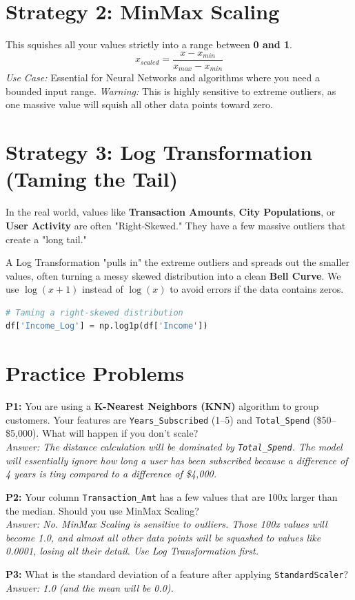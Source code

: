 \documentclass{article}
\begin{document}
\section{Strategy 2: MinMax Scaling}
This squishes all your values strictly into a range between \textbf{0 and 1}.
\begin{equation}
    x_{scaled} = \frac{x - x_{min}}{x_{max} - x_{min}}
\end{equation}
\textit{Use Case:} Essential for Neural Networks and algorithms where you need a bounded input range.
\textit{Warning:} This is highly sensitive to extreme outliers, as one massive value will squish all other data points toward zero.

\section{Strategy 3: Log Transformation (Taming the Tail)}
In the real world, values like \textbf{Transaction Amounts}, \textbf{City Populations}, or \textbf{User Activity} are often "Right-Skewed." They have a few massive outliers that create a "long tail."

\begin{tcolorbox}[colback=orange!5!white,colframe=orange!75!black,title=The $\log(x+1)$ Trick]
A Log Transformation "pulls in" the extreme outliers and spreads out the smaller values, often turning a messy skewed distribution into a clean \textbf{Bell Curve}. We use $\log(x+1)$ instead of $\log(x)$ to avoid errors if the data contains zeros.
\end{tcolorbox}

\begin{lstlisting}[language=Python]
# Taming a right-skewed distribution
df['Income_Log'] = np.log1p(df['Income'])
\end{lstlisting}

\section{Practice Problems}
\textbf{P1:} You are using a \textbf{K-Nearest Neighbors (KNN)} algorithm to group customers. Your features are \texttt{Years\_Subscribed} (1--5) and \texttt{Total\_Spend} (\$50--\$5,000). What will happen if you don't scale? \\
\textit{Answer: The distance calculation will be dominated by \texttt{Total\_Spend}. The model will essentially ignore how long a user has been subscribed because a difference of 4 years is tiny compared to a difference of \$4,000.}

\textbf{P2:} Your column \texttt{Transaction\_Amt} has a few values that are 100x larger than the median. Should you use MinMax Scaling? \\
\textit{Answer: No. MinMax Scaling is sensitive to outliers. Those 100x values will become 1.0, and almost all other data points will be squashed to values like 0.0001, losing all their detail. Use Log Transformation first.}

\textbf{P3:} What is the standard deviation of a feature after applying \texttt{StandardScaler}? \\
\textit{Answer: 1.0 (and the mean will be 0.0).}
\end{document}
